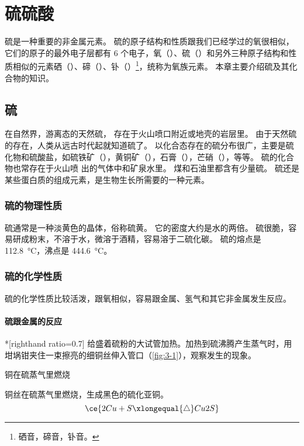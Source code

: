 \chapter{硫\texorpdfstring{\quad}{ }硫酸}
硫是一种重要的非金属元素。
硫的原子结构和性质跟我们已经学过的氧很相似，它们的原子的最外电子层都有 6 个电子，氧（）、硫（）和另外三种原子结构和性质相似的元素硒（）、碲（）、钋（）\footnote{硒音，碲音，钋音。}，统称为氧族元素。
本章主要介绍硫及其化合物的知识。

\section{硫}
在自然界，游离态的天然硫， 存在于火山喷口附近或地壳的岩层里。
由于天然硫的存在，人类从远古时代起就知道硫了。
以化合态存在的硫分布很广，主要是硫化物和硫酸盐，如硫铁矿（），黄铜矿（），石膏（），芒硝（），等等。
硫的化合物也常存在于火山喷 出的气体中和矿泉水里。
煤和石油里都含有少量硫。
硫还是某些蛋白质的组成元素，是生物生长所需要的一种元素。

\subsection{硫的物理性质}
硫通常是一种淡黄色的晶体，俗称硫黄。
它的密度大约是水的两倍。
硫很脆，容易研成粉末，不溶于水，微溶于酒精，容易溶于二硫化碳。
硫的熔点是 \qty{112.8}{\celsius}，沸点是 \qty{444.6}{\celsius}。

\subsection{硫的化学性质}
硫的化学性质比较活泼，跟氧相似，容易跟金属、氢气和其它非金属发生反应。

\subsubsection{硫跟金属的反应}
\begin{Experiment}*[righthand ratio=0.7]
给盛着硫粉的大试管加热。加热到硫沸腾产生蒸气时，用坩埚钳夹住一束擦亮的细铜丝伸入管口（\cref{fig:3-1}），观察发生的现象。
  \tcblower 
  \begin{figurehere}
    \caption{铜在硫蒸气里燃烧}\label{fig:3-1}
  \end{figurehere}
\end{Experiment}
铜丝在硫蒸气里燃烧，生成黑色的硫化亚铜。
\[ \ce{ 2Cu + S \xlongequal{\triangle} Cu2S}\]

